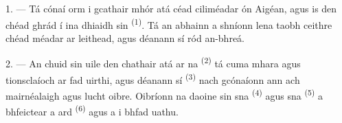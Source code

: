 %
%
%

\VUsaut{2.0mm}
\VUsaut{3.0mm}
\VUfilet{16mm}
\VUsaut{5.6mm}
\VUsaut{1.4mm}
\VUsaut{2.2mm}

\VUsaut{3.0mm}

1. --- Tá cónaí orm i gcathair mhór atá céad ciliméadar ón Aigéan, agus is
 den chéad ghrád í ina dhiaidh sin \textsuperscript{(1)}. Tá an
abhainn a shníonn lena taobh ceithre chéad méadar ar leithead, agus déanann sí ród
an-bhreá.

2. --- An chuid sin uile den chathair atá ar na 
\textsuperscript{(2)} tá cuma mhara agus tionsclaíoch ar fad uirthi, agus déanann sí
 \textsuperscript{(3)} nach gcónaíonn ann ach mairnéalaigh agus
lucht oibre. Oibríonn na daoine sin sna  \textsuperscript{(4)} agus
sna  \textsuperscript{(5)} a bhfeictear a  ard
\textsuperscript{(6)} agus a  i bhfad uathu.

